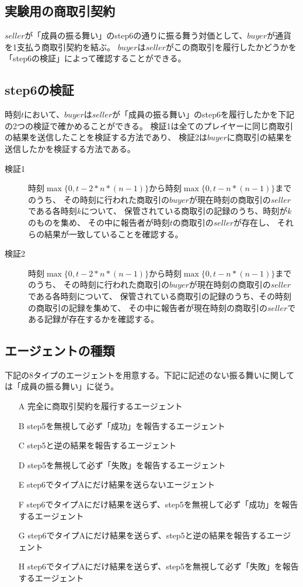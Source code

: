   \subsection{実験用の商取引契約}
  $seller$が「成員の振る舞い」のstep6の通りに振る舞う対価として、$buyer$が通貨を1支払う商取引契約を結ぶ。
  $buyer$は$seller$がこの商取引を履行したかどうかを「step6の検証」によって確認することができる。

  \subsection{step6の検証}
  時刻$t$において、$buyer$は$seller$が「成員の振る舞い」のstep6を履行したかを下記の2つの検証で確かめることができる。
  検証1は全てのプレイヤーに同じ商取引の結果を送信したことを検証する方法であり、
  検証2は$buyer$に商取引の結果を送信したかを検証する方法である。
  
  \begin{description}
    \item[検証1] 時刻$\max\{0, t-2*n*(n-1)\}$から時刻$\max\{0, t-n*(n-1)\}$までのうち、
      その時刻に行われた商取引の$buyer$が現在時刻の商取引の$seller$である各時刻$k$について、
      保管されている商取引の記録のうち、時刻が$k$のものを集め、
      その中に報告者が時刻$t$の商取引の$seller$が存在し、
      それらの結果が一致していることを確認する。
    \item[検証2] 時刻$\max\{0, t-2*n*(n-1)\}$から時刻$\max\{0, t-n*(n-1)\}$までのうち、
      その時刻に行われた商取引の$buyer$が現在時刻の商取引の$seller$である各時刻について、
      保管されている商取引の記録のうち、その時刻の商取引の記録を集めて、
      その中に報告者が現在時刻の商取引の$seller$である記録が存在するかを確認する。
  \end{description}

  
  \subsection{エージェントの種類}
    下記の8タイプのエージェントを用意する。下記に記述のない振る舞いに関しては「成員の振る舞い」に従う。
    \begin{itemize}
      \item[A] 完全に商取引契約を履行するエージェント
      \item[B] step5を無視して必ず「成功」を報告するエージェント
      \item[C] step5と逆の結果を報告するエージェント
      \item[D] step5を無視して必ず「失敗」を報告するエージェント
      \item[E] step6でタイプAにだけ結果を送らないエージェント
      \item[F] step6でタイプAにだけ結果を送らず、step5を無視して必ず「成功」を報告するエージェント
      \item[G] step6でタイプAにだけ結果を送らず、step5と逆の結果を報告するエージェント
      \item[H] step6でタイプAにだけ結果を送らず、step5を無視して必ず「失敗」を報告するエージェント
    \end{itemize}

